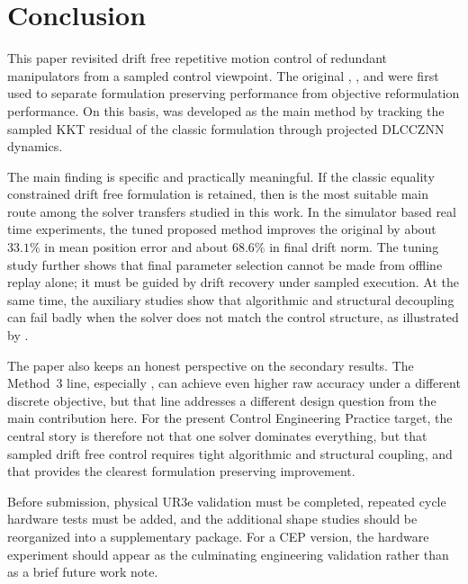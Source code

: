 \section{Conclusion}

This paper revisited drift free repetitive motion control of redundant manipulators from a sampled control viewpoint. The original \methodone{}, \methodtwo{}, and \methodthree{} were first used to separate formulation preserving performance from objective reformulation performance. On this basis, \methodtwoDL{} was developed as the main method by tracking the sampled KKT residual of the classic \methodtwo{} formulation through projected DLCCZNN dynamics.

The main finding is specific and practically meaningful. If the classic equality constrained drift free formulation is retained, then \methodtwoDL{} is the most suitable main route among the solver transfers studied in this work. In the simulator based real time experiments, the tuned proposed method improves the original \methodtwo{} by about $33.1\%$ in mean position error and about $68.6\%$ in final drift norm. The tuning study further shows that final parameter selection cannot be made from offline replay alone; it must be guided by drift recovery under sampled execution. At the same time, the auxiliary studies show that algorithmic and structural decoupling can fail badly when the solver does not match the control structure, as illustrated by \methodthreelcc{}.

The paper also keeps an honest perspective on the secondary results. The Method~3 line, especially \methodthreepcg{}, can achieve even higher raw accuracy under a different discrete objective, but that line addresses a different design question from the main contribution here. For the present Control Engineering Practice target, the central story is therefore not that one solver dominates everything, but that sampled drift free control requires tight algorithmic and structural coupling, and that \methodtwoDL{} provides the clearest formulation preserving improvement.

Before submission, physical UR3e validation must be completed, repeated cycle hardware tests must be added, and the additional shape studies should be reorganized into a supplementary package. For a CEP version, the hardware experiment should appear as the culminating engineering validation rather than as a brief future work note.
